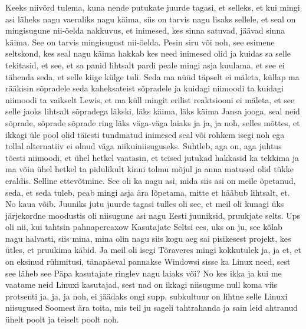 Keeks niivõrd tulema, kuna nende putukate juurde tagasi, et selleks, et kui mingi asi läheks nagu vaeraliks nagu käima, siis on tarvis nagu lisaks sellele, et seal on mingisugune nii-öelda nakkuvus, et inimesed, kes sinna satuvad, jäävad sinna käima. See on tarvis mingisugust nii-öelda. Pesin siru või noh, see esimene seltskond, kes seal nagu käima hakkab kes need inimesed olid ja kuidas sa selle tekitasid, et see, et sa panid lihtsalt pardi peale mingi asja kuulama, et see ei tähenda seda, et selle kiige külge tuli. Seda ma nüüd täpselt ei mäleta, küllap ma rääkisin sõpradele seda kaheksateist sõpradele ja kuidagi niimoodi ta kuidagi niimoodi ta vaikselt Lewis, et ma küll mingit erilist reaktsiooni ei mäleta, et see selle jaoks lihtsalt sõpradega läkski, läks käima, läks käima Jansa jooga, seal neid sõprade, sõprade sõprade ring läks väga-väga laiaks ja ja, ja noh, selles mõttes, et ikkagi üle pool olid täiesti tundmatud inimesed seal või rohkem isegi noh ega tollal alternatiiv ei olnud väga niikuiniisuguseks. Suhtleb, aga on, aga juhtus tõesti niimoodi, et ühel hetkel vaatasin, et teised jutukad hakkasid ka tekkima ja ma võin ühel hetkel ta pidulikult kinni tolmu mõjul ja anna matused olid tükke eraldis. Selline ettevõtmine. See oli ka nagu asi, mida siis asi on meile õpetanud, seda, et seda tuleb, peab mingi asja ära lõpetama, mitte et hääbub lihtsalt, et. No kaua võib. Juuniks jutu juurde tagasi tulles oli see, et meil oli kunagi üks järjekordne moodustis oli niisugune asi nagu Eesti juuniksid, pruukjate selts. Ups oli nii, kui tahtsin pahnapercaxow Kasutajate Seltsi ees, uks on ju, see kõlab nagu halvasti, siis mina, mina olin nagu siis kogu aeg sai pisikesest projekt, kes ütles, et pruukima käbid.
Ja meil oli isegi Tõraveres mingi kokkutulek ja, ja et, et on eksinud rühmitusi, tänapäeval pannakse Windowsi sisse ka Linux need, sest see läheb see Päpa kasutajate ringlev nagu laiaks või? No kes ikka ja kui me vaatame neid Linuxi kasutajad, sest nad on ikkagi niisugune null koma viis protsenti ja, ja, ja noh, ei jäädaks ongi supp, subkultuur on lihtne selle Linuxi niisugused Soomest ära toita, mis teil ju sageli tahtrahanda ja sain leid ahtranud ühelt poolt ja teiselt poolt noh.
